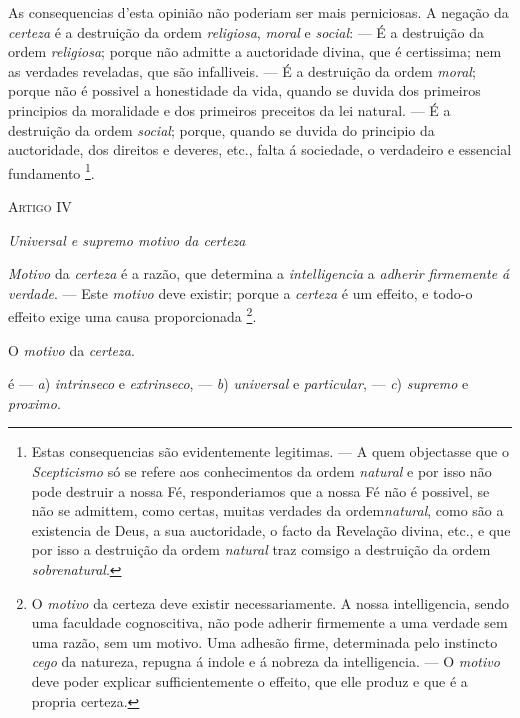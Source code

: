  
As consequencias d'esta opinião não poderiam ser mais perniciosas. A negação da \emph{certeza} é a destruição da ordem \emph{religiosa}, \emph{moral} e \emph{social}: --- É a destruição da ordem \emph{religiosa}; porque não admitte a auctoridade divina, que é certissima; nem as verdades reveladas, que são infalliveis. --- É a destruição da ordem \emph{moral}; porque não é possivel a honestidade da vida, quando se duvida dos primeiros principios da moralidade e dos primeiros preceitos da lei natural. --- É a destruição da ordem \emph{social}; porque, quando se duvida do principio da auctoridade, dos direitos e deveres, etc., falta á sociedade, o verdadeiro e essencial fundamento \footnote{Estas consequencias são evidentemente legitimas. --- A quem objectasse que o \emph{Scepticismo} só se refere aos conhecimentos da ordem \emph{natural} e por isso não pode destruir a nossa Fé, responderiamos que a nossa Fé não é possivel, se não se admittem, como certas, muitas verdades da ordem\emph{natural}, como são a existencia de Deus, a sua auctoridade, o facto da Revelação divina, etc., e que por isso a destruição da ordem \emph{natural} traz comsigo a destruição da ordem \emph{sobrenatural}.}.

\textsc{Artigo IV}

\emph{Universal e supremo motivo da certeza}


 
\emph{Motivo} da \emph{certeza} é a razão, que determina a \emph{intelligencia} a \emph{adherir firmemente á verdade}. --- Este \emph{motivo} deve existir; porque a \emph{certeza} é um effeito, e todo-o effeito exige uma causa proporcionada \footnote{O \emph{motivo} da certeza deve existir necessariamente. A nossa intelligencia, sendo uma faculdade cognoscitiva, não pode adherir firmemente a uma verdade sem uma razão, sem um motivo. Uma adhesão firme, determinada pelo instincto \emph{cego} da natureza, repugna á indole e á nobreza da intelligencia. --- O \emph{motivo} deve poder explicar sufficientemente o effeito, que elle produz e que é a propria certeza.}.


O \emph{motivo} da \emph{certeza}.

é --- \emph{a}) \emph{intrinseco} e \emph{extrinseco}, --- \emph{b}) \emph{universal} e \emph{particular}, --- \emph{c}) \emph{supremo} e \emph{proximo}.


